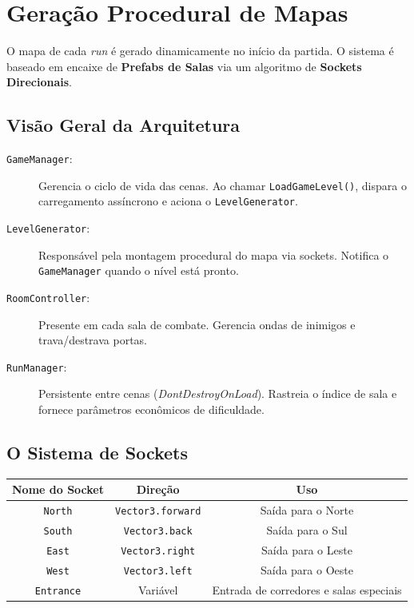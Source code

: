 \documentclass[a4paper,12pt]{report}
\begin{document}
\chapter{Geração Procedural de Mapas}\label{cap:geracao}

O mapa de cada \textit{run} é gerado dinamicamente no início da partida. O sistema é baseado em encaixe de \textbf{Prefabs de Salas} via um algoritmo de \textbf{Sockets Direcionais}.

\section{Visão Geral da Arquitetura}
\begin{description}
    \item[\texttt{GameManager}:] Gerencia o ciclo de vida das cenas. Ao chamar \texttt{LoadGameLevel()}, dispara o carregamento assíncrono e aciona o \texttt{LevelGenerator}.
    \item[\texttt{LevelGenerator}:] Responsável pela montagem procedural do mapa via sockets. Notifica o \texttt{GameManager} quando o nível está pronto.
    \item[\texttt{RoomController}:] Presente em cada sala de combate. Gerencia ondas de inimigos e trava/destrava portas.
    \item[\texttt{RunManager}:] Persistente entre cenas (\textit{DontDestroyOnLoad}). Rastreia o índice de sala e fornece parâmetros econômicos de dificuldade.
\end{description}

\section{O Sistema de Sockets}
\begin{center}
\begin{tabular}{|c|c|c|}
    \hline
    \textbf{Nome do Socket} & \textbf{Direção} & \textbf{Uso} \\
    \hline
    \texttt{North} & \texttt{Vector3.forward} & Saída para o Norte \\
    \texttt{South} & \texttt{Vector3.back}    & Saída para o Sul  \\
    \texttt{East}  & \texttt{Vector3.right}   & Saída para o Leste \\
    \texttt{West}  & \texttt{Vector3.left}    & Saída para o Oeste \\
    \texttt{Entrance} & Variável & Entrada de corredores e salas especiais \\
    \hline
\end{tabular}
\end{center}
\end{document}
